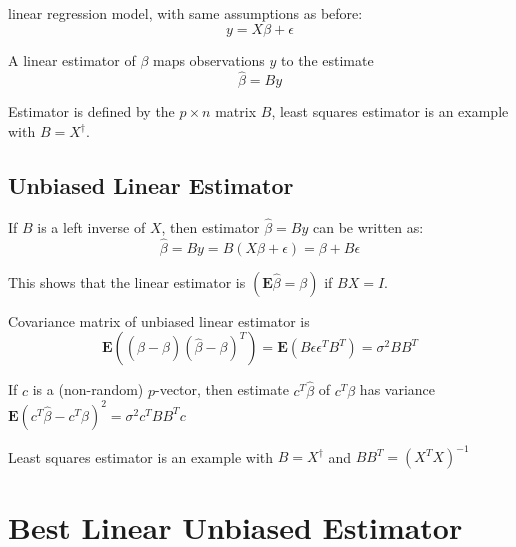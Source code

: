 \begin{problem}
    linear regression model, with same assumptions as before:
$$
y=X \beta+\epsilon
$$
\end{problem}

\begin{definition}
    A linear estimator of $ \beta $ maps observations $ y $ to the estimate
$$
\hat{\beta}=B y
$$

Estimator is defined by the $ p \times n $ matrix $ B $, least squares estimator is an example with $ B=X^{\dagger} $.
\end{definition}




\subsection{Unbiased Linear Estimator}

\begin{theorem}
    If $ B $ is a left inverse of $ X $, then estimator $ \hat{\beta}=B y $ can be written as:
$$
\hat{\beta}=B y=B(X \beta+\epsilon)=\beta+B \epsilon
$$
\end{theorem}

\begin{corollary}
    This shows that the linear estimator is  $ (\mathbf{E} \hat{\beta}=\beta) $ if $ B X=I $.
\end{corollary}

\begin{theorem}
    Covariance matrix of unbiased linear estimator is
$$
\mathbf{E}\left((\hat{\beta}-\beta)(\hat{\beta}-\beta)^{T}\right)=\mathbf{E}\left(B \epsilon \epsilon^{T} B^{T}\right)=\sigma^{2} B B^{T}
$$
\end{theorem}

\begin{theorem}
    If $ c $ is a (non-random) $ p $-vector, then estimate $ c^{T} \hat{\beta} $ of $ c^{T} \beta $ has variance
$ \mathbf{E}\left(c^{T} \hat{\beta}-c^{T} \beta\right)^{2}=\sigma^{2} c^{T} B B^{T} c $
\end{theorem}

\begin{corollary}
    Least squares estimator is an example with $ B=X^{\dagger} $ and $ B B^{T}=\left(X^{T} X\right)^{-1} $
\end{corollary}



\section{Best Linear Unbiased Estimator}

